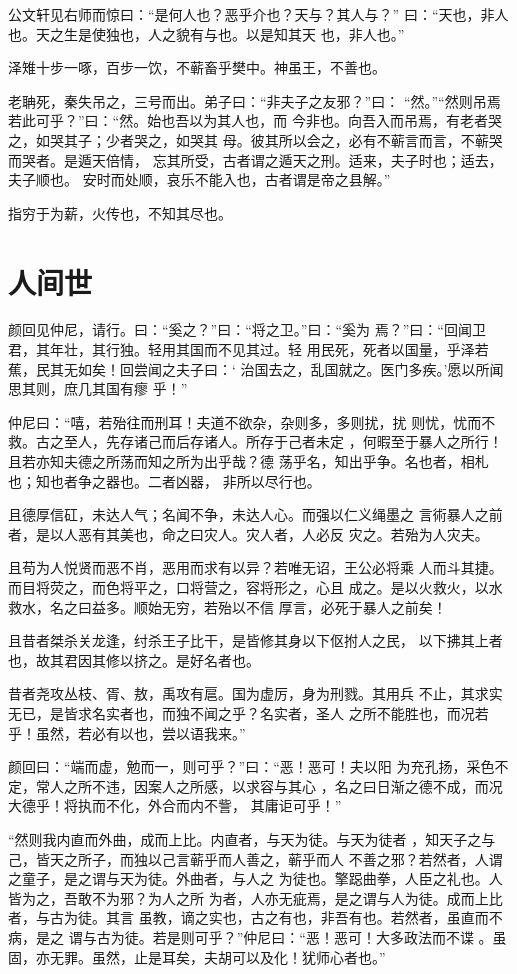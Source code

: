 \documentclass[12pt,UTF8]{ctexbook}
\begin{document}
公文轩见右师而惊曰：“是何人也？恶乎介也？天与？其人与？” 曰：“天也，非人也。天之生是使独也，人之貌有与也。以是知其天 也，非人也。”

泽雉十步一啄，百步一饮，不蕲畜乎樊中。神虽王，不善也。

老聃死，秦失吊之，三号而出。弟子曰：“非夫子之友邪？”曰： “然。”“然则吊焉若此可乎？”曰：“然。始也吾以为其人也，而 今非也。向吾入而吊焉，有老者哭之，如哭其子；少者哭之，如哭其 母。彼其所以会之，必有不蕲言而言，不蕲哭而哭者。是遁天倍情， 忘其所受，古者谓之遁天之刑。适来，夫子时也；适去，夫子顺也。 安时而处顺，哀乐不能入也，古者谓是帝之县解。”

指穷于为薪，火传也，不知其尽也。

\section{人间世}

颜回见仲尼，请行。曰：“奚之？”曰：“将之卫。”曰：“奚为 焉？”曰：“回闻卫君，其年壮，其行独。轻用其国而不见其过。轻 用民死，死者以国量，乎泽若蕉，民其无如矣！回尝闻之夫子曰：‘ 治国去之，乱国就之。医门多疾。’愿以所闻思其则，庶几其国有瘳 乎！”

仲尼曰：“嘻，若殆往而刑耳！夫道不欲杂，杂则多，多则扰，扰 则忧，忧而不救。古之至人，先存诸己而后存诸人。所存于己者未定 ，何暇至于暴人之所行！且若亦知夫德之所荡而知之所为出乎哉？德 荡乎名，知出乎争。名也者，相札也；知也者争之器也。二者凶器， 非所以尽行也。

且德厚信矼，未达人气；名闻不争，未达人心。而强以仁义绳墨之 言術暴人之前者，是以人恶有其美也，命之曰灾人。灾人者，人必反 灾之。若殆为人灾夫。

且苟为人悦贤而恶不肖，恶用而求有以异？若唯无诏，王公必将乘 人而斗其捷。而目将荧之，而色将平之，口将营之，容将形之，心且 成之。是以火救火，以水救水，名之曰益多。顺始无穷，若殆以不信 厚言，必死于暴人之前矣！

且昔者桀杀关龙逢，纣杀王子比干，是皆修其身以下伛拊人之民， 以下拂其上者也，故其君因其修以挤之。是好名者也。

昔者尧攻丛枝、胥、敖，禹攻有扈。国为虚厉，身为刑戮。其用兵 不止，其求实无已，是皆求名实者也，而独不闻之乎？名实者，圣人 之所不能胜也，而况若乎！虽然，若必有以也，尝以语我来。”

颜回曰：“端而虚，勉而一，则可乎？”曰：“恶！恶可！夫以阳 为充孔扬，采色不定，常人之所不违，因案人之所感，以求容与其心 ，名之曰日渐之德不成，而况大德乎！将执而不化，外合而内不訾， 其庸讵可乎！”

“然则我内直而外曲，成而上比。内直者，与天为徒。与天为徒者 ，知天子之与己，皆天之所子，而独以己言蕲乎而人善之，蕲乎而人 不善之邪？若然者，人谓之童子，是之谓与天为徒。外曲者，与人之 为徒也。擎跽曲拳，人臣之礼也。人皆为之，吾敢不为邪？为人之所 为者，人亦无疵焉，是之谓与人为徒。成而上比者，与古为徒。其言 虽教，谪之实也，古之有也，非吾有也。若然者，虽直而不病，是之 谓与古为徒。若是则可乎？”仲尼曰：“恶！恶可！大多政法而不谍 。虽固，亦无罪。虽然，止是耳矣，夫胡可以及化！犹师心者也。”
\end{document}
